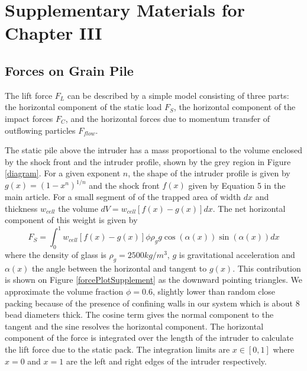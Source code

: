\chapter{Supplementary Materials for Chapter III}
\author{Mohammad Y Karim, Eric I. Corwin}


\section{Forces on Grain Pile}
The lift force $F_{L}$ can be described by a simple model consisting of three parts: the horizontal component of the static load $F_{S}$, the horizontal component of the impact forces $F_{C}$, and the horizontal forces due to momentum transfer of outflowing particles $F_{flow}$.  

The static pile above the intruder has a mass proportional to the volume enclosed by the shock front and the intruder profile, shown by the grey region in Figure \ref{diagram}. For a given exponent $n$, the shape of the intruder profile is given by $g(x)=(1-x^n)^{1/n}$ and the shock front $f(x)$ given by Equation 5 in the main article. For a small segment of of the trapped area of width $dx$ and thickness $w_{cell}$ the volume $dV=w_{cell}[f(x)-g(x)]dx$. The net horizontal component of this weight is given by
\begin{equation} 
F_{S} = \int_0^1  w_{cell}  [f(x)-g(x)] \phi\rho_{g}g\cos(\alpha(x)) \sin(\alpha(x))dx
\label{fstatic}
\end{equation}
where the density of glass is $\rho_{g}=2500kg/m^3$, $g$ is gravitational acceleration and $\alpha(x)$ the angle between the horizontal and tangent to $g(x)$. This contribution is shown on Figure \ref{forcePlotSupplement} as the downward pointing triangles. We approximate the volume fraction $\phi=0.6$, slightly lower than random close packing because of the presence of confining walls in our system which is about 8 bead diameters thick. The cosine term gives the normal component to the tangent and the sine resolves the horizontal component. The horizontal component of the force is integrated over the length of the intruder to calculate the lift force due to the static pack. The integration limits are $x\in[0,1]$ where $x=0$ and $x=1$ are the left and right edges of the intruder respectively. 

